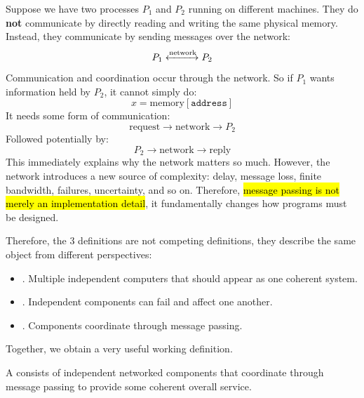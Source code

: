 \highspace
Suppose we have two processes $P_1$ and $P_2$ running on different machines. They do \textbf{not} communicate by directly reading and writing the same physical memory. Instead, they communicate by sending messages over the network:
\begin{equation*}
    P_1 \xleftrightarrow{\text{network}} P_2
\end{equation*}
Communication and coordination occur through the network. So if $P_1$ wants information held by $P_2$, it cannot simply do:
\begin{equation*}
    x = \text{memory}\left[\texttt{address}\right]
\end{equation*}
It needs some form of communication:
\begin{equation*}
    \text{request}
    \rightarrow
    \text{network}
    \rightarrow
    P_2
\end{equation*}
Followed potentially by:
\begin{equation*}
    P_2
    \rightarrow
    \text{network}
    \rightarrow
    \text{reply}
\end{equation*}
This immediately explains why the network matters so much. However, the network introduces a new source of complexity: delay, message loss, finite bandwidth, failures, uncertainty, and so on. Therefore, \hl{message passing is not merely an implementation detail}, it fundamentally changes how programs must be designed.

\highspace
Therefore, the 3 definitions are not competing definitions, they describe the same object from different perspectives:
\begin{itemize}
    \item {}. Multiple independent computers that should appear as one coherent system.

    \item {}. Independent components can fail and affect one another.

    \item {}. Components coordinate through message passing.
\end{itemize}
Together, we obtain a very useful working definition.

\highspace
\begin{definitionbox}
    A  consists of independent networked components that coordinate through message passing to provide some coherent overall service.
\end{definitionbox}


